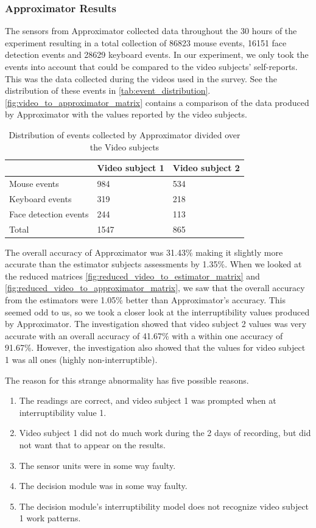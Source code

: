 \documentclass{sigchi}
\begin{document}
\subsubsection{Approximator Results}
The sensors from Approximator collected data throughout the 30 hours of the experiment resulting in a total collection of 86823 mouse events, 16151 face detection events and 28629 keyboard events.
In our experiment, we only took the events into account that could be compared to the video subjects' self-reports.
This was the data collected during the videos used in the survey. See the distribution of these events in \autoref{tab:event_distribution}.
\autoref{fig:video_to_approximator_matrix} contains a comparison of the data produced by Approximator with the values reported by the video subjects.

\begin{table}[h]
  \centering
  \begin{tabular}{@{}lll@{}}
    \toprule
     & Video subject 1 & Video subject 2\\ \midrule
    Mouse events       & 984    & 534    \\
    Keyboard events       & 319    & 218    \\
    Face detection events       & 244    & 113    \\ \midrule
    Total   & 1547 & 865\\ \bottomrule
  \end{tabular}
  \caption{Distribution of events collected by Approximator divided over the Video subjects}
  \label{tab:event_distribution}
\end{table}

The overall accuracy of Approximator was 31.43\% making it slightly more accurate than the estimator subjects assessments by 1.35\%.
When we looked at the reduced matrices \autoref{fig:reduced_video_to_estimator_matrix} and \autoref{fig:reduced_video_to_approximator_matrix}, we saw that the overall accuracy from the estimators were 1.05\% better than Approximator's accuracy.
This seemed odd to us, so we took a closer look at the interruptibility values produced by Approximator.
The investigation showed that video subject 2 values was very accurate with an overall accuracy of 41.67\% with a within one accuracy of 91.67\%.
However, the investigation also showed that the values for video subject 1 was all ones (highly non-interruptible).

The reason for this strange abnormality has five possible reasons.
\begin{enumerate}
  \item The readings are correct, and video subject 1 was prompted when at interruptibility value 1.
  \item Video subject 1 did not do much work during the 2 days of recording, but did not want that to appear on the results.
  \item The sensor units were in some way faulty.
  \item The decision module was in some way faulty.
  \item The decision module's interruptibility model does not recognize video subject 1 work patterns.
\end{enumerate}
\end{document}
